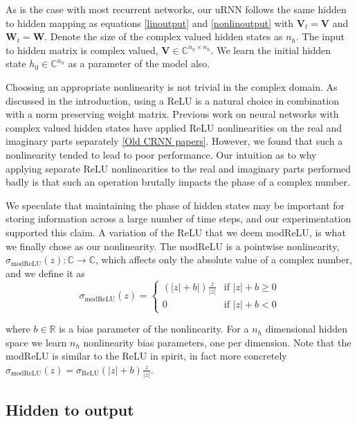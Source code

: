 \documentclass{article} %
\newcommand{\matr}[1]{\mathbf{#1}}
\newcommand\RR{\mathbb{R}}
\newcommand\CC{\mathbb{C}}
\begin{document}
As is the case with most recurrent networks, our uRNN follows the same hidden to hidden mapping as 
equations \ref{linoutput} and \ref{nonlinoutput} with $\matr{V}_t = \matr{V}$ and $\matr{W}_t = \matr{W}$. 
Denote the size of the complex valued hidden states as $n_h$.
The input to hidden matrix is complex valued, $\matr{V} \in \CC^{n_h \times n_h}$. 
We learn the initial hidden state $h_0 \in \CC^{n_h}$ as a parameter of the model also.

Choosing an appropriate nonlinearity is not trivial in the complex domain.
As discussed in the introduction, using a ReLU is a natural choice in combination with a norm preserving
weight matrix. {\color{red}Previous work on neural networks with complex valued} hidden states 
have applied ReLU nonlinearities on the real and imaginary parts separately \ref{Old CRNN papers}.
However, we found that such a nonlinearity {\color{red}tended to lead to} poor performance.
Our intuition as to why applying separate ReLU nonlinearities to the real 
and imaginary parts performed badly is that such an operation brutally impacts the 
phase of a complex number.

We speculate that maintaining the phase of hidden states may be important for storing information 
across a large number of time steps, and our experimentation supported this claim.
A variation of the ReLU that we deem modReLU, is what we 
finally chose as our nonlinearity. The modReLU is a pointwise nonlinearity,  
$\sigma_\mathrm{modReLU} (z) : \CC \rightarrow \CC$, which
affects only the absolute value of a complex number, and we define it as 
\begin{equation} \sigma_\mathrm{modReLU} (z) = 
\left\{
  \begin{array}{ll}
    (|z|+b|) \frac{z}{|z|}  & \mbox{if } |z| + b \geq 0 \\
    0 & \mbox{if } |z| + b < 0
  \end{array}
\right.
\end{equation}

where $b \in \RR$ is a bias parameter of the nonlinearity. For a $n_h$ dimensional hidden space
we learn $n_h$ nonlinearity bias parameters, one per dimension. 
Note that the modReLU is similar to the ReLU in spirit, in fact more concretely
$\sigma_\mathrm{modReLU}(z) = \sigma_\mathrm{ReLU}(|z| + b) \frac{z}{|z|}$. 

\subsection{Hidden to output}
\end{document}
